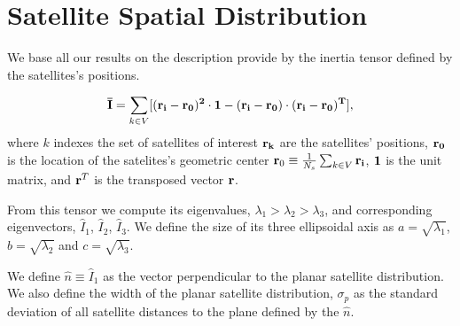 \documentclass[a4paper,fleqn,usenatbib]{mnras}
\begin{document}
\section{Satellite Spatial Distribution}
\label{sec:SpatialMeasurements}

We base all our results on the description provide by the inertia
tensor defined by the satellites's positions.  

\begin{equation}
{\bf{\bar{I}}} = \sum_{k \in V}[(\bf{r}_i - \bf{r}_0)^2\cdot \bf{1} -
  (\bf{r}_i-\bf{r}_0)\cdot (\bf{r}_i - \bf{r}_0)^{T}],
\end{equation}
%
where $k$ indexes the set of satellites of interest
$\bf{r}_k$ are the satellites' positions, $\bf{r}_{0}$ is the location
of the satelites's geometric center ${\bf r}_{0}\equiv \frac{1}{N_s}\sum_{k\in
  V} \bf{r}_i$, $\bf{1}$ is the unit matrix,  and  
${\bf r}^T$ is the transposed vector $\bf{r}$. 

From this tensor we compute its eigenvalues,
$\lambda_1>\lambda_2>\lambda_3$, and corresponding eigenvectors,
$\hat{I}_1$, $\hat{I}_2$, $\hat{I}_3$.
We define the size of its three ellipsoidal axis as
$a=\sqrt{\lambda_1}$, $b=\sqrt{\lambda_2}$ and $c=\sqrt{\lambda_3}$.

We define $\hat{n}\equiv \hat{I}_1$ as the vector perpendicular to the
planar satellite distribution. 
We also define the width of the planar satellite distribution,
$\sigma_p$ as the standard deviation of all satellite distances to the
plane defined by the $\hat{n}$.

\end{document}
